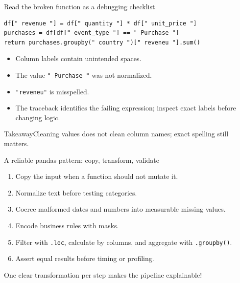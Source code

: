 \documentclass[11pt,aspectratio=43]{beamer}
\newcommand{\code}[1]{\texttt{#1}}
\newcommand{\takeaway}[1]{%
  \par\vspace{0.4em}
  \begin{block}{Takeaway}#1\end{block}}
\begin{document}
\begin{frame}[fragile]{Read the broken function as a debugging checklist}
\begin{lstlisting}
df[" revenue "] = df[" quantity "] * df[" unit_price "]
purchases = df[df[" event_type "] == " Purchase "]
return purchases.groupby(" country ")[" reveneu "].sum()
\end{lstlisting}
\begin{itemize}
  \item Column labels contain unintended spaces.
  \item The value \code{" Purchase "} was not normalized.
  \item \code{"reveneu"} is misspelled.
  \item The traceback identifies the failing expression; inspect exact labels before changing logic.
\end{itemize}
\takeaway{Cleaning values does not clean column names; exact spelling still matters.}
\end{frame}

\begin{frame}{A reliable pandas pattern: copy, transform, validate}
\large
\begin{enumerate}
  \item Copy the input when a function should not mutate it.
  \item Normalize text before testing categories.
  \item Coerce malformed dates and numbers into measurable missing values.
  \item Encode business rules with masks.
  \item Filter with \texttt{.loc}, calculate by columns, and aggregate with \texttt{.groupby()}.
  \item Assert equal results before timing or profiling.
\end{enumerate}
\vfill
One clear transformation per step makes the pipeline explainable!
\end{frame}
\end{document}
